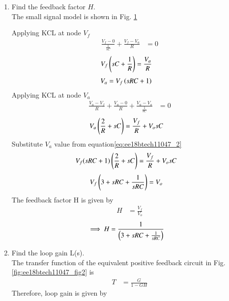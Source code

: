 \begin{enumerate}[label=\thesection.\arabic*.,ref=\thesection.\theenumi]
%
\item Find the feedback factor $H$. \\
\solution The small signal model is shown in Fig. \ref{fig:ee18btech11047_fig3}
\begin{figure}[!ht]
	\begin{center}
		\resizebox{\columnwidth}{!}{}
	\end{center}
\caption{}
\label{fig:ee18btech11047_fig3}
\end{figure}
Applying KCL at node $V_f$
\begin{align}
\frac{V_{f} - 0}{\frac{1}{sC}} +\frac{V_{f} - V_{a}}{R} &= 0
\end{align}
\begin{align}
V_{f}\left(sC+\frac{1}{R}\right) &= \frac{V_{a}}{R} 
\end{align}
\begin{align}
\label{eq:ee18btech11047_2}
V_{a} &= V_{f}\brak{sRC + 1} 
\end{align}
Applying KCL at node $V_{a}$
\begin{align}
\frac{V_{a} - V_{f}}{R} + \frac{V_{a} - 0}{R} + \frac{V_{a} - V_{o}}{\frac{1}{sC}} &= 0
\end{align}
\begin{align}
V_{a}\left(\frac{2}{R} +sC\right) &= \frac{V_{f}}{R} + V_{o}sC
\end{align}
Substitute $V_{a}$ value from equation\eqref{eq:ee18btech11047_2}
\begin{align}
V_{f}(sRC + 1)\left(\frac{2}{R} + sC\right) &= \frac{V_{f}}{R} + V_{o}sC
\end{align}
\begin{align}
V_{f}\left(3 + sRC + \frac{1}{sRC}\right) &= V_{o}
\end{align}
The feedback factor H is given by 
\begin{align}
H &= \frac{V_{f}}{V_{o}}
\end{align}
\begin{align}
\label{eq:ee18btech11047_3}
\implies H &= \frac{1}{\brak{3+sRC +\frac{1}{sRC}}}
\end{align}
%
\item Find the loop gain L(s).\\
\solution The transfer function of the equivalent positive feedback circuit in Fig. \ref{fig:ee18btech11047_fig2} is  
\begin{align}
T &= \frac{G}{1-GH}
\end{align}
Therefore, loop gain is given by 
\begin{align}

\end{align}
\end{enumerate}
